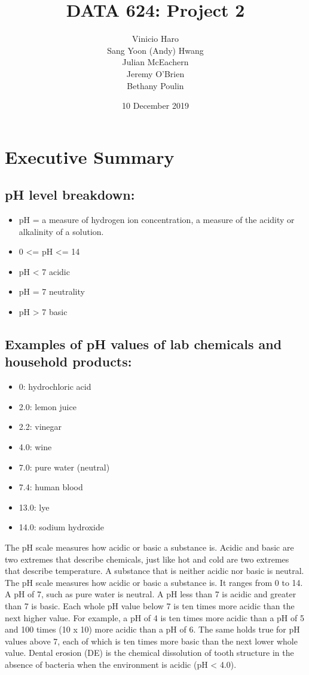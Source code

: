 \documentclass[]{report}
\title{DATA 624: Project 2}
\author{Vinicio Haro \\ Sang Yoon (Andy) Hwang \\ Julian McEachern \\ Jeremy O'Brien \\ Bethany Poulin}
\date{10 December 2019}
\providecommand{\tightlist}{%
  \setlength{\itemsep}{0pt}\setlength{\parskip}{0pt}}
\begin{document}
\maketitle

{
\setcounter{tocdepth}{1}
\tableofcontents
}
\chapter*{Executive Summary}\label{executive}

\section{pH level breakdown:}\label{ph-level-breakdown}

\begin{itemize}
\tightlist
\item
  pH = a measure of hydrogen ion concentration, a measure of the acidity
  or alkalinity of a solution.
\item
  0 \textless{}= pH \textless{}= 14
\item
  pH \textless{} 7 acidic
\item
  pH = 7 neutrality
\item
  pH \textgreater{} 7 basic
\end{itemize}

\section{Examples of pH values of lab chemicals and household
products:}\label{examples-of-ph-values-of-lab-chemicals-and-household-products}

\begin{itemize}
\tightlist
\item
  0: hydrochloric acid
\item
  2.0: lemon juice
\item
  2.2: vinegar
\item
  4.0: wine
\item
  7.0: pure water (neutral)
\item
  7.4: human blood
\item
  13.0: lye
\item
  14.0: sodium hydroxide
\end{itemize}

The pH scale measures how acidic or basic a substance is. Acidic and
basic are two extremes that describe chemicals, just like hot and cold
are two extremes that describe temperature. A substance that is neither
acidic nor basic is neutral. The pH scale measures how acidic or basic a
substance is. It ranges from 0 to 14. A pH of 7, such as pure water is
neutral. A pH less than 7 is acidic and greater than 7 is basic. Each
whole pH value below 7 is ten times more acidic than the next higher
value. For example, a pH of 4 is ten times more acidic than a pH of 5
and 100 times (10 x 10) more acidic than a pH of 6. The same holds true
for pH values above 7, each of which is ten times more basic than the
next lower whole value. Dental erosion (DE) is the chemical dissolution
of tooth structure in the absence of bacteria when the environment is
acidic (pH \textless{} 4.0).
\end{document}
